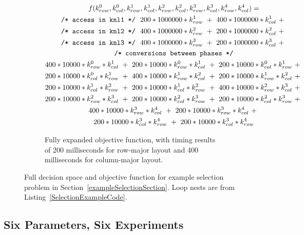\begin{figure}
\begin{subfigure}{\columnwidth}
\begin{gather*}
	f(k_{row}^{0}, k_{col}^{0}, k_{row}^{1}, k_{col}^{1},k_{row}^{2}, k_{col}^{2},k_{row}^{3}, k_{col}^{3},k_{row}^{4}, k_{col}^{4}) = \\
	\text{\texttt{/* access in knl1 */}} \ \ 
	200 * 1000000 * k_{row}^1 \ + \ 
	400 * 1000000 * k_{col}^1 \ + \ \\
	\text{\texttt{/* access in knl2 */}} \ \
	400 * 1000000 * k_{row}^2 \ + \ 
	200 * 1000000 * k_{col}^2 \ + \ \\
	\text{\texttt{/* access in knl3 */}} \ \
	400 * 1000000 * k_{row}^3 \ + \ 
	200 * 1000000 * k_{col}^3 \ + \ \\
	\text{\texttt{/* conversions between phases */}} \\
	400 * 10000 * k_{row}^0 * k_{col}^1 \ + \ 200 * 10000 * k_{row}^0 * k_{col}^1 \ + \ 200 * 10000 * k_{col}^0 * k_{row}^1 \ + \ \\
	200 * 10000 * k_{col}^0 * k_{row}^1 \ + \ 400 * 10000 * k_{row}^1 * k_{col}^2 \ + \ 200 * 10000 * k_{row}^1 * k_{col}^2 \ + \ \\
	200 * 10000 * k_{col}^1 * k_{row}^2 \ + \ 200 * 10000 * k_{col}^1 * k_{row}^2 \ + \ 400 * 10000 * k_{row}^2 * k_{col}^3 \ + \ \\
	200 * 10000 * k_{row}^2 * k_{col}^3 \ + \ 200 * 10000 * k_{col}^2 * k_{row}^3 \ + \ 200 * 10000 * k_{col}^2 * k_{row}^3 \ + \ \\
	400 * 10000 * k_{row}^3 * k_{col}^4 \ + \ 200 * 10000 * k_{row}^3 * k_{col}^4 \ + \ \\
  200 * 10000 * k_{col}^3 * k_{row}^4 \ + \ 200 * 10000 * k_{col}^3 * k_{row}^4
\end{gather*}
	\caption{Fully expanded objective function, with timing results of 200 milliseconds for row-major layout and 400 milliseconds for column-major layout.}
\end{subfigure}

\caption{Full decision space and objective function for example selection problem in Section~\ref{exampleSelectionSection}. Loop nests are from Listing~\ref{SelectionExampleCode}.}\label{fullExample}
\end{figure}


\subsection{Six Parameters, Six Experiments}\label{sec:modelExperiments}

